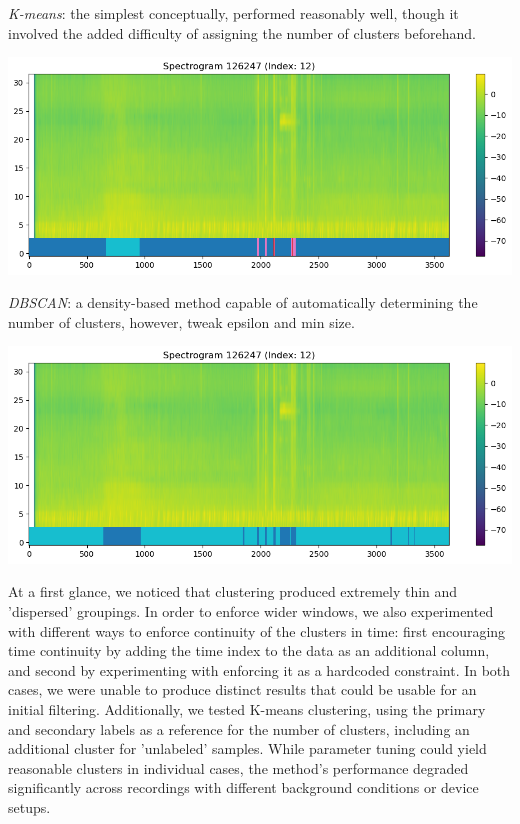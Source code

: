 \documentclass[10pt]{article}
\begin{document}
\begin{minipage}{0.6\linewidth}
\textit{K-means}: the simplest conceptually, performed reasonably well, though it involved the added difficulty of assigning the number of clusters beforehand.
\end{minipage}
\hfill
\begin{minipage}{0.35\linewidth}
  \includegraphics[width=\linewidth]{img/train_spectrogram_12_kmeans.png}
\end{minipage}

\vspace{1em}

\begin{minipage}{0.6\linewidth}
\textit{DBSCAN}: a density-based method capable of automatically determining the number of clusters, however, tweak epsilon and min size.
\end{minipage}
\hfill
\begin{minipage}{0.35\linewidth}
  \includegraphics[width=\linewidth]{img/train_spectrogram_12_dbscan.png}
\end{minipage}

At a first glance, we noticed that clustering produced extremely thin and 'dispersed' groupings. In order to enforce wider windows, we also experimented with different ways to enforce continuity of the clusters in time: first encouraging time continuity by adding the time index to the data as an additional column, and second by experimenting with enforcing it as a hardcoded constraint. In both cases, we were unable to produce distinct results that could be usable for an initial filtering. Additionally, we tested K-means clustering, using the primary and secondary labels as a reference for the number of clusters, including an additional cluster for 'unlabeled' samples. While parameter tuning could yield reasonable clusters in individual cases, the method's performance degraded significantly across recordings with different background conditions or device setups.
\end{document}
